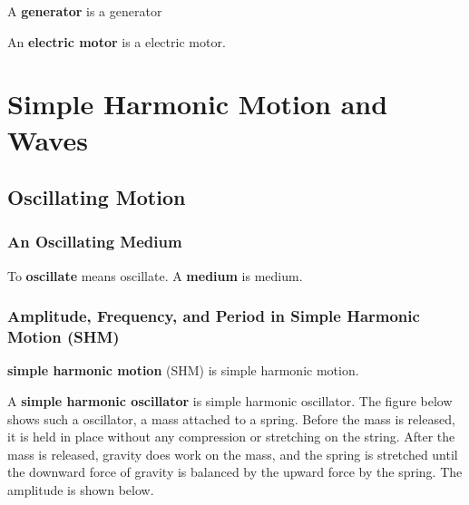 \documentclass[dvipsnames]{article}
\newif\ifShowUnitXI                              %
\begin{document}
A \textbf{\gls{generator}} is a \glsdesc{generator}

An \textbf{\gls{electric motor}} is a \glsdesc{electric motor}.

\fi

\clearpage


\section{Simple Harmonic Motion and Waves}

\ifShowUnitXI
\subsection{Oscillating Motion}

\subsubsection{An Oscillating Medium}

To \textbf{\gls{oscillate}} means \glsdesc{oscillate}. A \textbf{\gls{medium}} is \glsdesc{medium}. 

\subsubsection{Amplitude, Frequency, and Period in Simple Harmonic Motion (SHM)}

\textbf{\Gls{simple harmonic motion}} (SHM) is \glsdesc{simple harmonic motion}.

A \textbf{\gls{simple harmonic oscillator}} is \glsdesc{simple harmonic oscillator}. The figure below shows such a oscillator, a mass attached to a spring. Before the mass is released, it is held in place without any compression or stretching on the string. After the mass is released, gravity does work on the mass, and the spring is stretched until the downward force of gravity is balanced by the upward force by the spring. The amplitude is shown below.

\begin{center}
\end{center}
\end{document}
